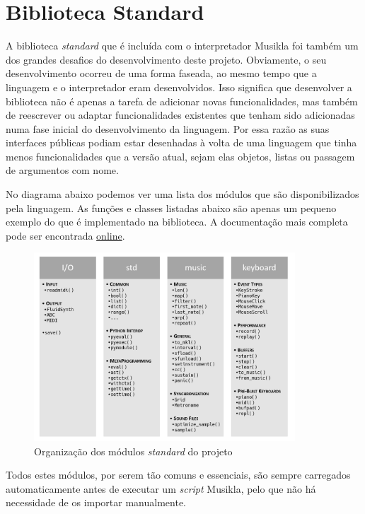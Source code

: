 \section{Biblioteca Standard}
A biblioteca \textit{standard} que é incluída com o interpretador Musikla foi também um dos grandes desafios do desenvolvimento deste projeto. Obviamente, o seu desenvolvimento ocorreu de uma forma faseada, ao mesmo tempo que a linguagem e o interpretador eram desenvolvidos. Isso significa que desenvolver a biblioteca não é apenas a tarefa de adicionar novas funcionalidades, mas também de reescrever ou adaptar funcionalidades existentes que tenham sido adicionadas numa fase inicial do desenvolvimento da linguagem. Por essa razão as suas interfaces públicas podiam estar desenhadas à volta de uma linguagem que tinha menos funcionalidades que a versão atual, sejam elas objetos, listas ou passagem de argumentos com nome.

No diagrama abaixo podemos ver uma lista dos módulos que são disponibilizados pela linguagem. As funções e classes listadas abaixo são apenas um pequeno exemplo do que é implementado na biblioteca. A documentação mais completa pode ser encontrada \href{https://pedromsilvapt.github.io/miei-dissertation/}{online}.

\begin{figure}[h]
\begin{center}
    \includegraphics[width=0.87\textwidth]{img/standard_library.png}
\end{center}
\caption{Organização dos módulos \textit{standard} do projeto}
\end{figure}

Todos estes módulos, por serem tão comuns e essenciais, são sempre carregados automaticamente antes de executar um \textit{script} Musikla, pelo que não há necessidade de os importar manualmente.

